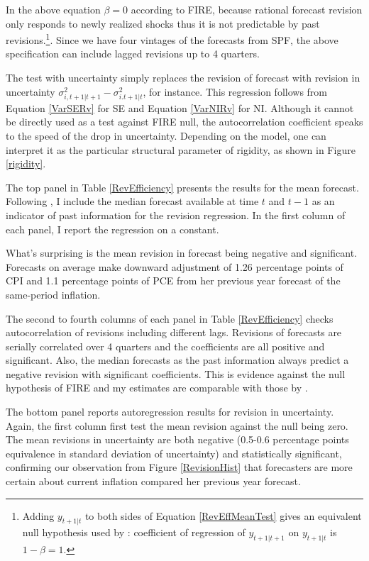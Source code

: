 \documentclass[12pt]{article}
\begin{document}
	In the above equation $\beta =0$ according to FIRE, because rational forecast revision only responds to newly realized shocks thus it is not predictable by past revisions.\footnote{Adding $y_{t+1|t}$ to both sides of Equation \ref{RevEffMeanTest} gives an equivalent null hypothesis used by \citet{fuhrer2018intrinsic}: coefficient of regression of $y_{t+1|t+1}$ on  $y_{t+1|t}$ is $1-\beta=1$. }. Since we have four vintages of the forecasts from SPF, the above specification can include lagged revisions up to 4 quarters.  
	
	The test with uncertainty simply replaces the revision of forecast with revision in uncertainty $\sigma^2_{i,t+1|t+1} - \sigma^2_{i.t+1|t}$, for instance. This regression follows from Equation \ref{VarSERv} for SE and Equation \ref{VarNIRv} for NI. Although it  cannot be directly used as a test against FIRE null, the autocorrelation coefficient speaks to the speed of the drop in uncertainty. Depending on the model, one can interpret it as the particular structural parameter of rigidity, as shown in Figure \ref{rigidity}. 
	
	The top panel in Table \ref{RevEfficiency} presents the results for the mean forecast. Following \citet{fuhrer2018intrinsic}, I include the median forecast available at time $t$ and $t-1$ as an indicator of past information for the revision regression. In the first column of each panel, I report the regression on a constant. 
	
		What's surprising is the mean revision in forecast being negative and significant. Forecasts on average make downward adjustment of 1.26 percentage points of CPI and  1.1 percentage points of PCE from her previous year forecast of the same-period inflation. 
	
	The second to fourth columns of each panel in Table \ref{RevEfficiency} checks autocorrelation of revisions including different lags. Revisions of forecasts are serially correlated over 4 quarters and the coefficients are all positive and significant. Also, the median forecasts as the past information always predict a negative revision with significant coefficients. This is evidence against the null hypothesis of FIRE and my estimates are comparable with those by \citet{fuhrer2018intrinsic}. 
	
	The bottom panel reports autoregression results for revision in uncertainty. Again, the first column first test the mean revision against the null being zero. The mean revisions in uncertainty are both negative (0.5-0.6 percentage points equivalence in standard deviation of uncertainty) and statistically significant, confirming our observation from Figure \ref{RevisionHist} that forecasters are more certain about current inflation compared her previous year forecast. 
	
\end{document}
